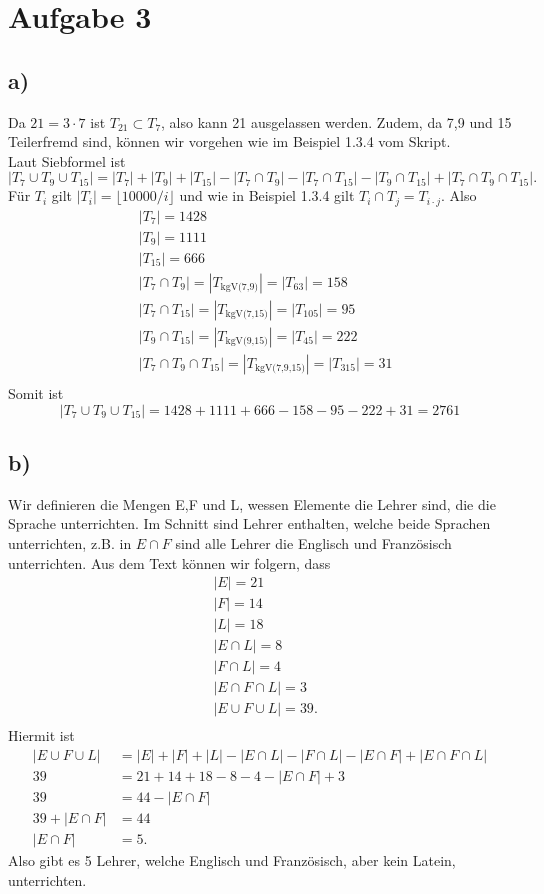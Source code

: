 \documentclass[12pt,german,a4paper]{article}
\begin{document}
\section*{Aufgabe 3}
\subsection*{a)}
Da $21=3\cdot7$ ist $T _{ 21 } \subset T _{ 7 } $, also kann 21 ausgelassen werden. Zudem, da 7,9 und 15 Teilerfremd sind, können wir vorgehen wie im Beispiel 1.3.4 vom Skript. \\
Laut Siebformel ist
$$|T_7\cup T_9\cup T _{ 15 } | = |T_{7}|+|T_{9}|+|T_{15}|-|T_{7}\cap T_{9}|-|T_{7}\cap T_{15}|-|T_{9}\cap T_{15}|+|T_{7}\cap T_{9}\cap T _{ 15 }|.$$
Für $T_i$ gilt $|T_i|=\lfloor 10000/i\rfloor$ und wie in Beispiel 1.3.4 gilt $T_i \cap T_j = T_{i\cdot j}$. Also
\begin{align*}
&|T_{7}|=1428 \\
&|T_{9}|=1111 \\
&|T_{15}|=666 \\
&|T_{7}\cap T_{9}| = |T_{\text{kgV(7,9)}}| = |T_{63}| = 158 \\
&|T_{7}\cap T_{15}| = |T_{\text{kgV(7,15)}}| = |T_{105}| = 95 \\
&|T_{9}\cap T_{15}| = |T_{\text{kgV(9,15)}}| = |T_{45}| = 222 \\
&|T_{7}\cap T_{9}\cap T_{15}| = |T_{\text{kgV(7,9,15)}}| = |T_{315}| = 31 \\
\end{align*}
Somit ist
$$
|T_7\cup T_9\cup T _{ 15 } | = 1428+1111+666-158-95-222+31=2761
$$
\subsection*{b)}
Wir definieren die Mengen E,F und L, wessen Elemente die Lehrer sind, die die Sprache unterrichten. Im Schnitt sind Lehrer enthalten, welche beide Sprachen unterrichten, z.B. in $E\cap F$ sind alle Lehrer die Englisch und Französisch unterrichten. Aus dem Text können wir folgern, dass
\begin{align*}
&|E|=21 \\
&|F|=14 \\
&|L|=18 \\
&|E\cap L|=8 \\
&|F\cap L|=4 \\
&|E\cap F\cap L|=3 \\
&|E\cup F\cup L|=39. \\
\end{align*}
Hiermit ist
\begin{align*}
|E\cup F\cup L| &= |E| + |F| + |L| - |E\cap L| - |F\cap L| - |E\cap F| + |E\cap F\cap L| \\
39 &= 21+14+18-8-4-|E\cap F|+3 \\
39 &= 44 -|E\cap F| \\
39+|E\cap F| &= 44 \\
|E\cap F| &= 5.
\end{align*}
Also gibt es 5 Lehrer, welche Englisch und Französisch, aber kein Latein, unterrichten.
\pagebreak
\end{document}
